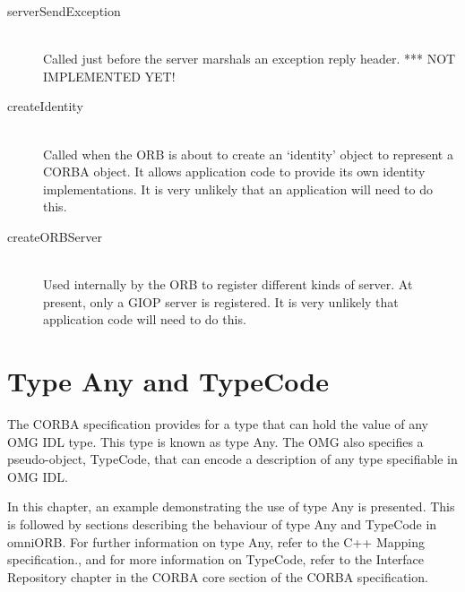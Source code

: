 \documentclass[11pt,twoside,a4paper]{book}
\begin{document}
\begin{description}
\item[serverSendException]\mbox{}\\
%
Called just before the server marshals an exception reply header. ***
NOT IMPLEMENTED YET!


\item[createIdentity]\mbox{}\\
%
Called when the ORB is about to create an `identity' object to
represent a CORBA object. It allows application code to provide its
own identity implementations. It is very unlikely that an application
will need to do this.


\item[createORBServer]\mbox{}\\
%
Used internally by the ORB to register different kinds of server. At
present, only a GIOP server is registered. It is very unlikely that
application code will need to do this.

\end{description}








\chapter{Type Any and TypeCode}
\label{chap:any}

The CORBA specification provides for a type that can hold the value of
any OMG IDL type. This type is known as type Any. The OMG also
specifies a pseudo-object, TypeCode, that can encode a description of
any type specifiable in OMG IDL.

In this chapter, an example demonstrating the use of type Any is
presented.  This is followed by sections describing the behaviour of
type Any and TypeCode in omniORB.  For further information on type
Any, refer to the C++ Mapping specification., and for more information
on TypeCode, refer to the Interface Repository chapter in the CORBA
core section of the CORBA specification.
\end{document}
